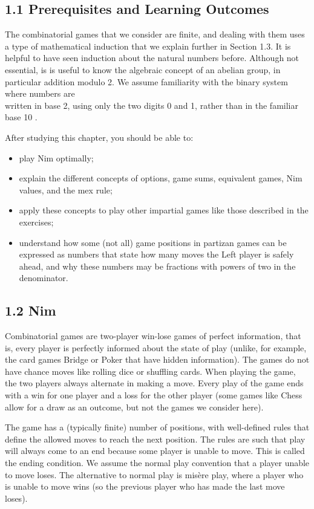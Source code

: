 \documentclass[12pt]{article}
\begin{document}
\subsection*{1.1 Prerequisites and Learning Outcomes}
The combinatorial games that we consider are finite, and dealing with them uses a type of mathematical induction that we explain further in Section 1.3. It is helpful to have seen induction about the natural numbers before. Although not essential, is is useful to know the algebraic concept of an abelian group, in particular addition modulo 2. We assume familiarity with the binary system where numbers are\\
written in base 2, using only the two digits 0 and 1, rather than in the familiar base 10 .

After studying this chapter, you should be able to:

\begin{itemize}
  \item play Nim optimally;
  \item explain the different concepts of options, game sums, equivalent games, Nim values, and the mex rule;
  \item apply these concepts to play other impartial games like those described in the exercises;
  \item understand how some (not all) game positions in partizan games can be expressed as numbers that state how many moves the Left player is safely ahead, and why these numbers may be fractions with powers of two in the denominator.
\end{itemize}

\subsection*{1.2 Nim}
Combinatorial games are two-player win-lose games of perfect information, that is, every player is perfectly informed about the state of play (unlike, for example, the card games Bridge or Poker that have hidden information). The games do not have chance moves like rolling dice or shuffling cards. When playing the game, the two players always alternate in making a move. Every play of the game ends with a win for one player and a loss for the other player (some games like Chess allow for a draw as an outcome, but not the games we consider here).

The game has a (typically finite) number of positions, with well-defined rules that define the allowed moves to reach the next position. The rules are such that play will always come to an end because some player is unable to move. This is called the ending condition. We assume the normal play convention that a player unable to move loses. The alternative to normal play is misère play, where a player who is unable to move wins (so the previous player who has made the last move loses).
\end{document}
